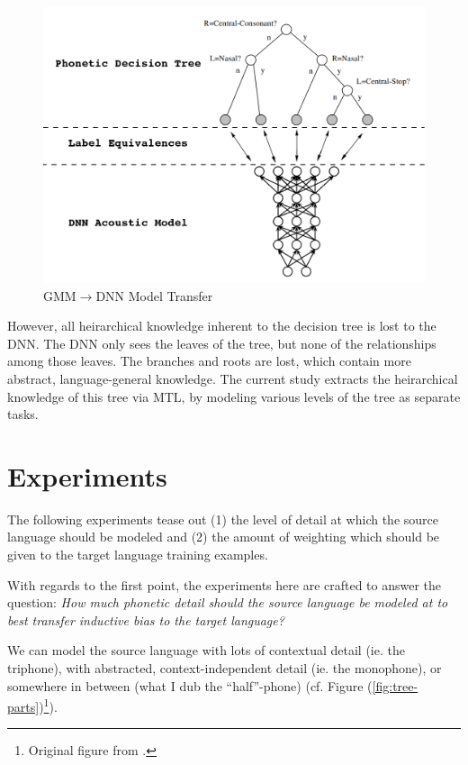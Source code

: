 \documentclass[a4paper]{article}
\begin{document}
\begin{figure}[!htbp]
  \centering
{}
  \includegraphics[width=\linewidth]{figs-1/tree-net.png}
  \caption{GMM$\rightarrow$DNN Model Transfer}
    \label{fig:tree-net}
  \endminipage\hfill
\end{figure}

However, all heirarchical knowledge inherent to the decision tree is lost to the DNN. The DNN only sees the leaves of the tree, but none of the relationships among those leaves. The branches and roots are lost, which contain more abstract, language-general knowledge. The current study extracts the heirarchical knowledge of this tree via MTL, by modeling various levels of the tree as separate tasks. 


\section{Experiments}

The following experiments tease out (1) the level of detail at which the source language should be modeled and (2) the amount of weighting which should be given to the target language training examples.

With regards to the first point, the experiments here are crafted to answer the question: \textit{How much phonetic detail should the source language be modeled at to best transfer inductive bias to the target language?}

We can model the source language with lots of contextual detail (ie. the triphone), with abstracted, context-independent detail (ie. the monophone), or somewhere in between (what I dub the ``half''-phone) (cf. Figure (\ref{fig:tree-parts})\footnote{Original figure from \cite{young2002}.}).
\end{document}
